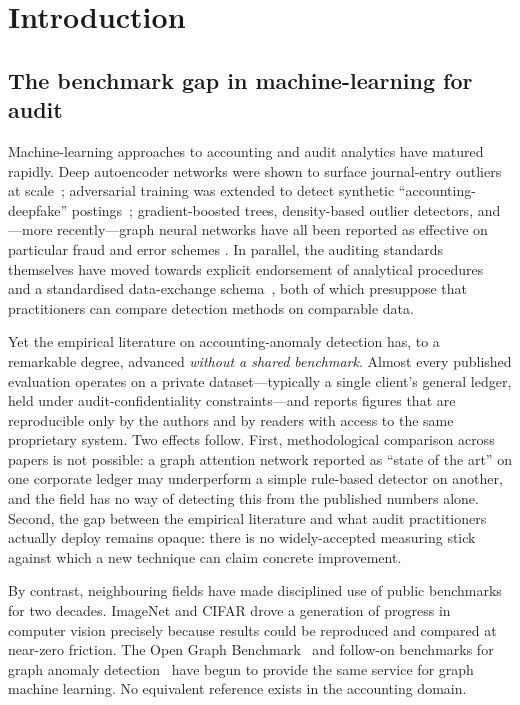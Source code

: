 \section{Introduction}
\label{sec:introduction}

\subsection{The benchmark gap in machine-learning for audit}
\label{sec:introduction:gap}

Machine-learning approaches to accounting and audit analytics have
matured rapidly.  Deep autoencoder networks were shown to surface
journal-entry outliers at scale~\citep{schreyer2017detection};
adversarial training was extended to detect synthetic
``accounting-deepfake'' postings~\citep{schreyer2019adversarial};
gradient-boosted trees, density-based outlier detectors, and---more
recently---graph neural networks have all been reported as effective on
particular fraud and error schemes
\citep{west2016intelligent,hilal2022financial}.  In parallel, the
auditing standards themselves have moved towards explicit endorsement
of analytical procedures~\citep{vasarhelyi2004principles,isa240} and a
standardised data-exchange schema~\citep{iso21378}, both of which
presuppose that practitioners can compare detection methods on
comparable data.

Yet the empirical literature on accounting-anomaly detection has, to a
remarkable degree, advanced \emph{without a shared benchmark}.  Almost
every published evaluation operates on a private dataset---typically a
single client's general ledger, held under audit-confidentiality
constraints---and reports figures that are reproducible only by the
authors and by readers with access to the same proprietary system.
Two effects follow.  First, methodological comparison across papers is
not possible: a graph attention network reported as ``state of the
art'' on one corporate ledger may underperform a simple rule-based
detector on another, and the field has no way of detecting this from
the published numbers alone.  Second, the gap between the empirical
literature and what audit practitioners actually deploy remains
opaque: there is no widely-accepted measuring stick against which a
new technique can claim concrete improvement.

By contrast, neighbouring fields have made disciplined use of public
benchmarks for two decades.  ImageNet and CIFAR
\citep{deng2009imagenet,krizhevsky2009cifar} drove a generation of
progress in computer vision precisely because results could be
reproduced and compared at near-zero friction.  The Open Graph
Benchmark~\citep{hu2020ogb} and follow-on benchmarks for graph anomaly
detection~\citep{liu2024gadbench,tang2023bond} have begun to provide
the same service for graph machine learning.  No equivalent reference
exists in the accounting domain.

